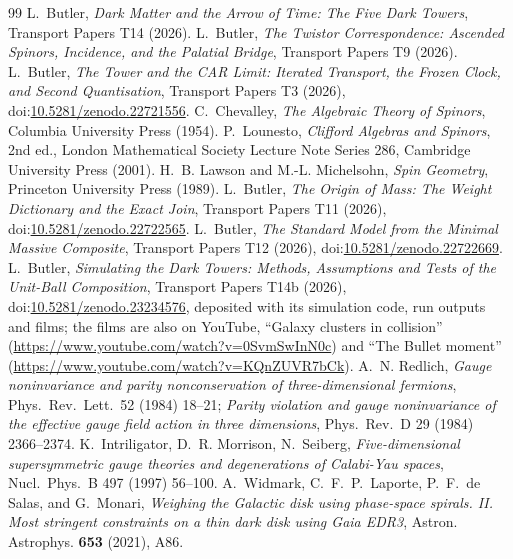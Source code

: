 \documentclass[11pt]{article}
\theoremstyle{definition}
\theoremstyle{plain}
\begin{document}
\begin{thebibliography}{99}
 L.~Butler,
\emph{Dark Matter and the Arrow of Time: The Five Dark Towers},
Transport Papers T14 (2026).
 L.~Butler,
\emph{The Twistor Correspondence: Ascended Spinors, Incidence, and the Palatial Bridge},
Transport Papers T9 (2026).
 L.~Butler,
\emph{The Tower and the CAR Limit: Iterated Transport, the Frozen Clock, and Second Quantisation},
Transport Papers T3 (2026), doi:\href{https://doi.org/10.5281/zenodo.22721556}{10.5281/zenodo.22721556}.
 C.~Chevalley,
\emph{The Algebraic Theory of Spinors},
Columbia University Press (1954).
 P.~Lounesto,
\emph{Clifford Algebras and Spinors}, 2nd ed.,
London Mathematical Society Lecture Note Series 286, Cambridge University Press (2001).
 H.~B. Lawson and M.-L. Michelsohn,
\emph{Spin Geometry},
Princeton University Press (1989).
 L.~Butler,
\emph{The Origin of Mass: The Weight Dictionary and the Exact Join},
Transport Papers T11 (2026), doi:\href{https://doi.org/10.5281/zenodo.22722565}{10.5281/zenodo.22722565}.
 L.~Butler,
\emph{The Standard Model from the Minimal Massive Composite},
Transport Papers T12 (2026), doi:\href{https://doi.org/10.5281/zenodo.22722669}{10.5281/zenodo.22722669}.
 L.~Butler,
\emph{Simulating the Dark Towers: Methods, Assumptions and Tests of the Unit-Ball Composition},
Transport Papers T14b (2026), doi:\href{https://doi.org/10.5281/zenodo.23234576}{10.5281/zenodo.23234576}, deposited with its simulation code, run outputs and films; the films are also on YouTube, ``Galaxy clusters in collision'' (\url{https://www.youtube.com/watch?v=0SvmSwInN0c}) and ``The Bullet moment'' (\url{https://www.youtube.com/watch?v=KQnZUVR7bCk}).
 A.~N. Redlich,
\emph{Gauge noninvariance and parity nonconservation of three-dimensional fermions},
Phys.\ Rev.\ Lett.\ 52 (1984) 18--21; \emph{Parity violation and gauge noninvariance of the effective gauge field action in three dimensions}, Phys.\ Rev.\ D 29 (1984) 2366--2374.
 K.~Intriligator, D.~R. Morrison, N.~Seiberg,
\emph{Five-dimensional supersymmetric gauge theories and degenerations of Calabi-Yau spaces},
Nucl.\ Phys.\ B 497 (1997) 56--100.
 A.~Widmark, C.~F.~P.~Laporte, P.~F.~de Salas, and G.~Monari,
\emph{Weighing the Galactic disk using phase-space spirals. II. Most stringent constraints on a thin dark disk using Gaia EDR3},
Astron. Astrophys. \textbf{653} (2021), A86.

\end{thebibliography}
\end{document}
